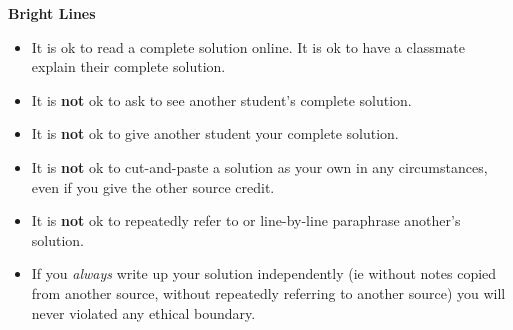 \documentclass[11pt]{article}
\begin{document}
\textbf{Bright Lines}
\begin{itemize}
\item It is ok to read a complete solution online. It is ok to have a classmate explain their complete solution.
\item It is \textbf{not} ok to ask to see another student's complete solution.
\item It is \textbf{not} ok to give another student your complete solution.
\item It is \textbf{not} ok to cut-and-paste a solution as your own in any circumstances, even if you give the other source credit.
\item It is \textbf{not} ok to repeatedly refer to or line-by-line paraphrase another's solution. 
\item If you \emph{always} write up your solution independently (ie without notes copied from another source, without repeatedly referring to another source) you will never violated any ethical boundary.
\end{itemize}
\end{document}
